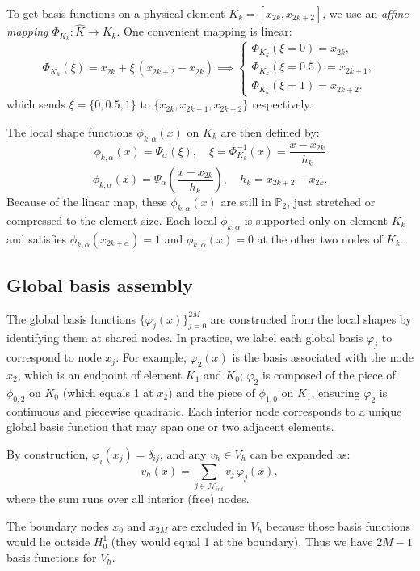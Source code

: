 \documentclass[a4paper,10pt]{report}
\begin{document}
To get basis functions on a physical element \(K_k = [x_{2k}, x_{2k+2}]\), we use an \emph{affine mapping} \(\Phi_{K_k}: \hat K \to K_k\).
One convenient mapping is linear:
\[
	\Phi_{K_k}(\xi) = x_{2k} + \xi\, (x_{2k+2}-x_{2k}) \implies
	\begin{cases}
		\Phi_{K_k}(\xi=0) = x_{2k},     \\
		\Phi_{K_k}(\xi=0.5) = x_{2k+1}, \\
		\Phi_{K_k}(\xi=1) = x_{2k+2}.
	\end{cases}
\]
which sends \(\xi=\{0,0.5,1\}\) to \(\{x_{2k}, x_{2k+1}, x_{2k+2}\}\) respectively.

The local shape functions \(\phi_{k,\alpha}(x)\) on \(K_k\) are then defined by:
\[
	\phi_{k,\alpha}(x) = \Psi_\alpha(\xi), \quad \xi = \Phi_{K_k}^{-1}(x) = \frac{x-x_{2k}}{h_k}
\]
\[
	\phi_{k,\alpha}(x) = \Psi_\alpha\left(\frac{x-x_{2k}}{h_k}\right), \quad h_k = x_{2k+2}-x_{2k}.
\]
Because of the linear map, these \(\phi_{k,\alpha}(x)\) are still in \(\mathbb{P}_2\), just stretched or compressed to the element size.
Each local \(\phi_{k,\alpha}\) is supported only on element \(K_k\) and satisfies \(\phi_{k,\alpha}(x_{2k+\alpha})=1\) and \(\phi_{k,\alpha}(x) =0\) at the other two nodes of \(K_k\).

\subsection*{Global basis assembly}
The global basis functions \(\{\varphi_j(x)\}_{j=0}^{2M}\) are constructed from the local shapes by identifying them at shared nodes.
In practice, we label each global basis \(\varphi_j\) to correspond to node \(x_j\).
For example, \(\varphi_2(x)\) is the basis associated with the node \(x_2\), which is an endpoint of element \(K_1\) and \(K_0\);
\(\varphi_2\) is composed of the piece of \(\phi_{0,2}\) on \(K_0\) (which equals 1 at \(x_2\)) and the piece of \(\phi_{1,0}\) on \(K_1\), ensuring \(\varphi_2\) is continuous and piecewise quadratic.
Each interior node corresponds to a unique global basis function that may span one or two adjacent elements.

By construction, \(\varphi_i(x_j) = \delta_{ij}\), and any \(v_h \in V_h\) can be expanded as:
\[
	v_h(x) = \sum_{j \in \mathcal{N}_{int}} v_j\, \varphi_j(x),
\]
where the sum runs over all interior (free) nodes.

The boundary nodes \(x_0\) and \(x_{2M}\) are excluded in \(V_h\) because those basis functions would lie outside \(H^1_0\) (they would equal 1 at the boundary).
Thus we have \(2M-1\) basis functions for \(V_h\).
\end{document}
